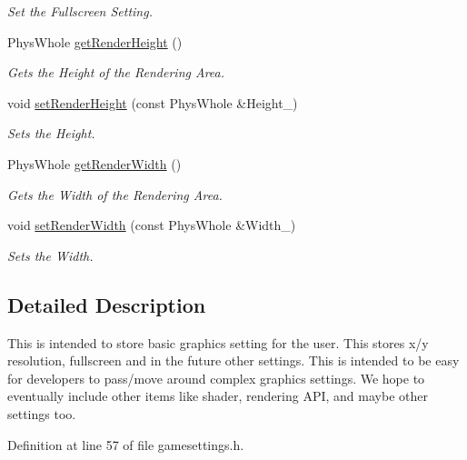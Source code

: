 \begin{DoxyCompactItemize}
\begin{DoxyCompactList}\small\item\em Set the Fullscreen Setting. \item\end{DoxyCompactList}\item 
PhysWhole \hyperlink{classphys_1_1GraphicsSettings_a3f44f36cf226bfff2f80bc6edf577cab}{getRenderHeight} ()
\begin{DoxyCompactList}\small\item\em Gets the Height of the Rendering Area. \item\end{DoxyCompactList}\item 
void \hyperlink{classphys_1_1GraphicsSettings_ace1f9f0f9c29a0c82524ce0bcffd16fa}{setRenderHeight} (const PhysWhole \&Height\_\-)
\begin{DoxyCompactList}\small\item\em Sets the Height. \item\end{DoxyCompactList}\item 
PhysWhole \hyperlink{classphys_1_1GraphicsSettings_a7e66859d70c88cd263c3bd6e9814069d}{getRenderWidth} ()
\begin{DoxyCompactList}\small\item\em Gets the Width of the Rendering Area. \item\end{DoxyCompactList}\item 
void \hyperlink{classphys_1_1GraphicsSettings_a4d74a7f2f880a5d556f43bcdbedc5e27}{setRenderWidth} (const PhysWhole \&Width\_\-)
\begin{DoxyCompactList}\small\item\em Sets the Width. \item\end{DoxyCompactList}\end{DoxyCompactItemize}


\subsection{Detailed Description}
This is intended to store basic graphics setting for the user. This stores x/y resolution, fullscreen and in the future other settings. This is intended to be easy for developers to pass/move around complex graphics settings. We hope to eventually include other items like shader, rendering API, and maybe other settings too. 

Definition at line 57 of file gamesettings.h.

